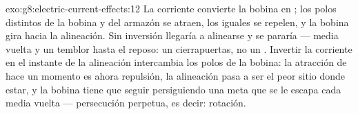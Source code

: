 \begin{solution}{exo:g8:electric-current-effects:12}
La corriente convierte la bobina en ; los polos distintos de
la bobina y del armazón se atraen, los iguales se repelen, y la
bobina gira hacia la alineación. Sin inversión llegaría a alinearse y
se pararía --- media vuelta y un temblor hasta el reposo: un cierrapuertas,
no un . Invertir la corriente en el instante de la alineación
intercambia los polos de la bobina: la atracción de hace un momento es
ahora repulsión, la alineación pasa a ser el peor sitio donde estar, y
la bobina tiene que seguir persiguiendo una meta que se le escapa cada
media vuelta --- persecución perpetua, es decir: rotación.
\end{solution}

